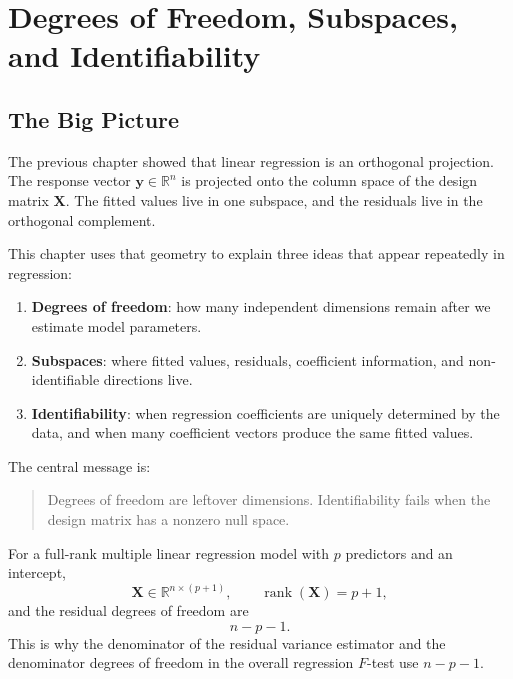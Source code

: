 \chapter{Degrees of Freedom, Subspaces, and Identifiability}
\label{chap:degrees-of-freedom-subspaces-identifiability}

\section{The Big Picture}

The previous chapter showed that linear regression is an orthogonal projection.  The response vector \(\mathbf{y}\in\mathbb{R}^n\) is projected onto the column space of the design matrix \(\mathbf{X}\).  The fitted values live in one subspace, and the residuals live in the orthogonal complement.

This chapter uses that geometry to explain three ideas that appear repeatedly in regression:
\begin{enumerate}
  \item \textbf{Degrees of freedom}: how many independent dimensions remain after we estimate model parameters.
  \item \textbf{Subspaces}: where fitted values, residuals, coefficient information, and non-identifiable directions live.
  \item \textbf{Identifiability}: when regression coefficients are uniquely determined by the data, and when many coefficient vectors produce the same fitted values.
\end{enumerate}

The central message is:
\begin{quote}
  Degrees of freedom are leftover dimensions.  Identifiability fails when the design matrix has a nonzero null space.
\end{quote}

For a full-rank multiple linear regression model with \(p\) predictors and an intercept,
\begin{equation}
  \mathbf{X}\in\mathbb{R}^{n\times(p+1)},
  \qquad
  \operatorname{rank}(\mathbf{X})=p+1,
\end{equation}
and the residual degrees of freedom are
\begin{equation}
  \boxed{n-p-1.}
\end{equation}
This is why the denominator of the residual variance estimator and the denominator degrees of freedom in the overall regression \(F\)-test use \(n-p-1\).

